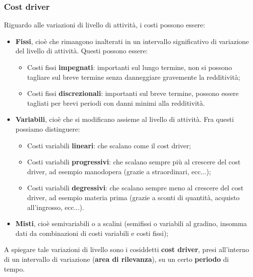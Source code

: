 \documentclass[a4paper,11pt]{article}
\begin{document}
\subsubsection{Cost driver}
Riguardo alle variazioni di livello di attività, i costi possono essere:
\begin{itemize}
	\item \textbf{Fissi}, cioè che rimangono inalterati in un intervallo significativo di variazione del livello di attività.
		Questi possono essere:
		\begin{itemize}
			\item Costi fissi \textbf{impegnati}: importanti sul lungo termine, non si possono tagliare sul breve termine senza danneggiare gravemente la redditività;
			\item Costi fissi \textbf{discrezionali}: importanti sul breve termine, possono essere tagliati per brevi periodi con danni minimi alla redditività.
		\end{itemize}
	\item \textbf{Variabili}, cioè che si modificano assieme al livello di attività.
		Fra questi possiamo distinguere:
		\begin{itemize}
			\item Costi variabili \textbf{lineari}: che scalano come il cost driver;
			\item Costi variabili \textbf{progressivi}: che scalano sempre più al crescere del cost driver, ad esempio manodopera (grazie a straordinari, ecc...);
			\item Costi variabili \textbf{degressivi}: che scalano sempre meno al crescere del cost driver, ad esempio materia prima (grazie a sconti di quantità, acquisto all'ingrosso, ecc...).
		\end{itemize}
	\item \textbf{Misti}, cioè semivariabili o a scalini (semifissi o variabili al gradino, insomma dati da combinazioni di costi variabili e costi fissi);
\end{itemize}

A spiegare tale variazioni di livello sono i cosiddetti \textbf{cost driver}, presi all'interno di un intervallo di variazione (\textbf{area di rilevanza}), su un certo \textbf{periodo} di tempo.
\end{document}
